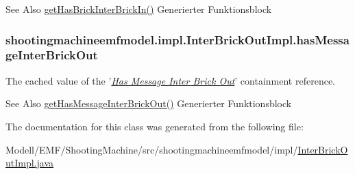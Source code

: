 \begin{DoxySeeAlso}{See Also}
\hyperlink{classshootingmachineemfmodel_1_1impl_1_1_inter_brick_out_impl_a9ce1832253cd613758fcf2c1ba674f15}{get\-Has\-Brick\-Inter\-Brick\-In()} Generierter Funktionsblock  
\end{DoxySeeAlso}
\hypertarget{classshootingmachineemfmodel_1_1impl_1_1_inter_brick_out_impl_ab81c612eaddbc8b20f373ecb407a53e2}{
\subsubsection[{has\-Message\-Inter\-Brick\-Out}]{ shootingmachineemfmodel.\-impl.\-Inter\-Brick\-Out\-Impl.\-has\-Message\-Inter\-Brick\-Out\hspace{0.3cm}{\ttfamily [protected]}}}\label{classshootingmachineemfmodel_1_1impl_1_1_inter_brick_out_impl_ab81c612eaddbc8b20f373ecb407a53e2}
The cached value of the '\hyperlink{classshootingmachineemfmodel_1_1impl_1_1_inter_brick_out_impl_a3e64e1506f7b5f296ccfe42cc7e9adca}{{\itshape Has Message Inter Brick Out}}' containment reference.

\begin{DoxySeeAlso}{See Also}
\hyperlink{classshootingmachineemfmodel_1_1impl_1_1_inter_brick_out_impl_a3e64e1506f7b5f296ccfe42cc7e9adca}{get\-Has\-Message\-Inter\-Brick\-Out()} Generierter Funktionsblock  
\end{DoxySeeAlso}


The documentation for this class was generated from the following file\-:\begin{DoxyCompactItemize}
\item 
Modell/\-E\-M\-F/\-Shooting\-Machine/src/shootingmachineemfmodel/impl/\hyperlink{_inter_brick_out_impl_8java}{Inter\-Brick\-Out\-Impl.\-java}\end{DoxyCompactItemize}
